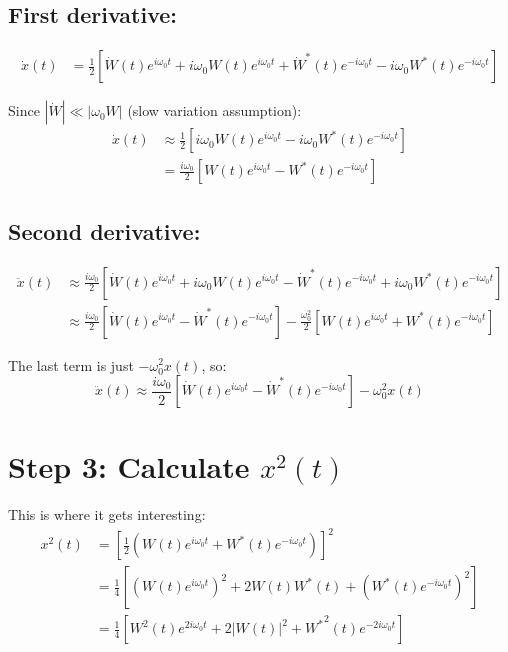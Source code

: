\documentclass{article}
\begin{document}
\subsection{First derivative:}
\begin{align}
\dot{x}(t) &= \frac{1}{2}[\dot{W}(t)e^{i\omega_0 t} + i\omega_0 W(t)e^{i\omega_0 t} + \dot{W}^*(t)e^{-i\omega_0 t} - i\omega_0 W^*(t)e^{-i\omega_0 t}]
\end{align}

Since $|\dot{W}| \ll |\omega_0 W|$ (slow variation assumption):
\begin{align}
\dot{x}(t) &\approx \frac{1}{2}[i\omega_0 W(t)e^{i\omega_0 t} - i\omega_0 W^*(t)e^{-i\omega_0 t}] \nonumber \\
&= \frac{i\omega_0}{2}[W(t)e^{i\omega_0 t} - W^*(t)e^{-i\omega_0 t}]
\end{align}

\subsection{Second derivative:}
\begin{align}
\ddot{x}(t) &\approx \frac{i\omega_0}{2}[\dot{W}(t)e^{i\omega_0 t} + i\omega_0 W(t)e^{i\omega_0 t} - \dot{W}^*(t)e^{-i\omega_0 t} + i\omega_0 W^*(t)e^{-i\omega_0 t}] \nonumber \\
&\approx \frac{i\omega_0}{2}[\dot{W}(t)e^{i\omega_0 t} - \dot{W}^*(t)e^{-i\omega_0 t}] - \frac{\omega_0^2}{2}[W(t)e^{i\omega_0 t} + W^*(t)e^{-i\omega_0 t}]
\end{align}

The last term is just $-\omega_0^2 x(t)$, so:
\begin{equation}
\ddot{x}(t) \approx \frac{i\omega_0}{2}[\dot{W}(t)e^{i\omega_0 t} - \dot{W}^*(t)e^{-i\omega_0 t}] - \omega_0^2 x(t)
\end{equation}

\section{Step 3: Calculate $x^2(t)$}

This is where it gets interesting:
\begin{align}
x^2(t) &= \left[\frac{1}{2}(W(t)e^{i\omega_0 t} + W^*(t)e^{-i\omega_0 t})\right]^2 \nonumber \\
&= \frac{1}{4}[(W(t)e^{i\omega_0 t})^2 + 2W(t)W^*(t) + (W^*(t)e^{-i\omega_0 t})^2] \nonumber \\
&= \frac{1}{4}[W^2(t)e^{2i\omega_0 t} + 2|W(t)|^2 + {W^*}^2(t)e^{-2i\omega_0 t}]
\end{align}
\end{document}
